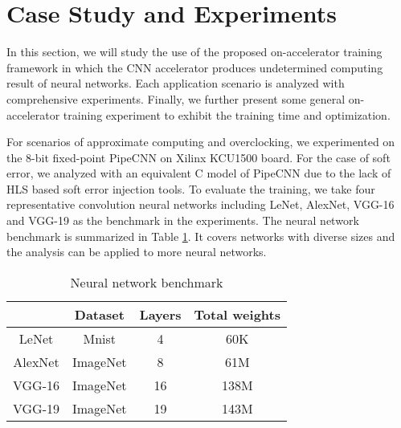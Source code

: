 \section{Case Study and Experiments} \label{sec:casestudy}
In this section, we will study the use of the proposed on-accelerator training framework 
in which the CNN accelerator produces undetermined computing result of neural networks.
Each application scenario is analyzed with comprehensive experiments. 
Finally, we further present some general on-accelerator training experiment to 
exhibit the training time and optimization.

For scenarios of approximate computing and overclocking, we experimented on the 8-bit 
fixed-point PipeCNN \cite{pipecnn_2} on Xilinx KCU1500 board. For the case of soft error, 
we analyzed with an equivalent C model of PipeCNN due to the lack of 
HLS based soft error injection tools. To evaluate the training, 
we take four representative convolution neural networks including LeNet, 
AlexNet, VGG-16 and VGG-19 as the benchmark in the experiments. The neural network 
benchmark is summarized in Table \ref{tab:CNN-table}. It covers networks with 
diverse sizes and the analysis can be applied to more neural networks.

\begin{table}
        \centering
        \vspace{-0.3em}
        \caption{Neural network benchmark}
        \label{tab:CNN-table}
        \vspace{-0.3em}
        \begin{tabular}{c|c|c|c}
		\toprule
		  & Dataset & Layers & Total weights \\
		\midrule
		LeNet & Mnist & 4 & 60K \\
		\midrule
		AlexNet & ImageNet & 8 & 61M \\
		\midrule
		VGG-16 & ImageNet & 16 & 138M \\
		\midrule
		VGG-19 & ImageNet & 19 & 143M \\
		\bottomrule
        \end{tabular}
        \vspace{-1em}
\end{table}


